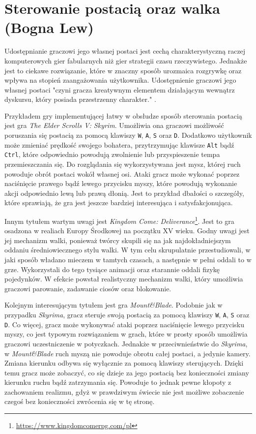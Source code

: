 \section{Sterowanie postacią oraz walka (Bogna Lew)}\label{s:walka}
Udostępnianie graczowi jego własnej postaci jest cechą charakterystyczną raczej komputerowych gier fabularnych niż gier
strategii czasu rzeczywistego. Jednakże jest to ciekawe rozwiązanie, które w znaczny sposób urozmaica rozgrywkę oraz
wpływa na stopień zaangażowania użytkownika. Udostępnienie graczowi jego własnej postaci "czyni gracza kreatywnym
elementem działającym wewnątrz dyskursu, który posiada przestrzenny charakter." \cite{olbrzymwcieniu}.

Przykładem gry implementującej łatwy w obsłudze sposób sterowania postacią jest gra \textit{The Elder Scrolls V: Skyrim}. Umożliwia
ona graczowi możliwość poruszania się postacią za pomocą klawiszy \texttt{W}, \texttt{A}, \texttt{S} oraz \texttt{D}. Dodatkowo użytkownik może
zmieniać prędkość swojego bohatera, przytrzymując klawisze \texttt{Alt} bądź \texttt{Ctrl}, które odpowiednio powodują zwolnienie lub
przyspieszenie tempa przemieszczania się. Do rozglądania się wykorzystywana jest mysz, której ruch powoduje obrót postaci
wokół własnej osi. Ataki gracz może wykonać poprzez naciśnięcie prawego bądź lewego przycisku myszy, które powodują
wykonanie akcji odpowiednio lewą lub prawą dłonią. Jest to przykład dbałości o szczegóły, które sprawiają, że gra
jest jeszcze bardziej interesująca i satysfakcjonująca.

Innym tytułem wartym uwagi jest \textit{Kingdom Come: Deliverance}\footnote{\url{https://www.kingdomcomerpg.com/pl}}. Jest to gra osadzona w realiach Europy Środkowej na początku
XV wieku. Godny uwagi jest jej mechanizm walki, ponieważ twórcy skupili się na jak najdokładniejszym oddaniu średniowiecznego
stylu walki. W tym celu skrupulatnie przestudiowali, w jaki sposób władano mieczem w tamtych czasach, a następnie w
pełni oddali to w grze. Wykorzystali do tego tysiące animacji oraz starannie oddali fizykę pojedynków. W efekcie powstał
realistyczny mechanizm walki, który umożliwia graczowi parowanie, zadawanie ciosów oraz blokowanie.

Kolejnym interesującym tytułem jest gra \textit{Mount\&Blade}. Podobnie jak w przypadku \textit{Skyrima}, gracz steruje swoją postacią za
pomocą klawiszy \texttt{W}, \texttt{A}, \texttt{S} oraz \texttt{D}. Co więcej, gracz może wykonywać ataki poprzez naciśnięcie
lewego przycisku myszy, co jest typowym rozwiązaniem w grach,
które w prosty sposób umożliwia graczowi uczestniczenie w potyczkach. Jednakże w przeciwnieństwie do \textit{Skyrima}, w
\textit{Mount\&Blade} ruch myszą nie powoduje obrotu całej postaci,
a jedynie kamery. Zmiana kierunku odbywa się wyłącznie za pomocą klawiszy sterujących. Dzięki temu gracz może zobaczyć, co
się dzieje za jego postacią bez konieczności zmiany kierunku ruchu bądź zatrzymania się. Powoduje to jednak pewne kłopoty z zachowaniem
realizmu, gdyż w prawdziwym świecie nie jest możliwe zobaczenie czegoś bez konieczności zwrócenia się w tę stronę.

